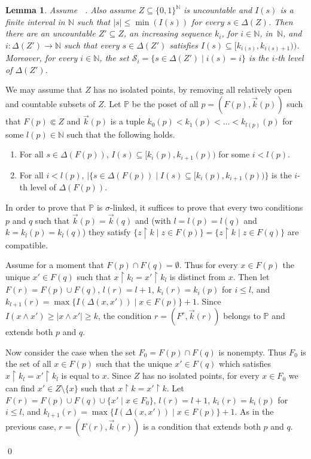 \documentclass{amsart}
\makeatletter
\def\N{\mathbb N}                        %
\def\rs{\restriction}
\def\text{\mbox}
\newtheorem{lemma}[proposition]{Lemma}
\theoremstyle{definition}
\theoremstyle{remark}
\def\twoo{\{0,1\}^{\N}}
\renewcommand{\proofname}{Proof}
\renewenvironment{proof}[1][\proofname]{\par
\let\oldqedsymbol\qedsymbol             %
  \normalfont
  \topsep6\p@\@plus6\p@ \trivlist
  \item[\hskip\labelsep\hskip\parindent\scshape
    #1\@addpunct{.}]\ignorespaces
}{%
  \qed\endtrivlist
\global\let\qedsymbol\oldqedsymbol      %
}
\newcommand{\bbN}{\mathbb N}
\newcommand{\cS}{\mathcal S}
\newcommand{\bbP}{\mathbb P}
\DeclareMathOperator{\MAsigma}{MA(\sigma-\text{linked})}
\numberwithin{claim}{subsection}
\makeatother
\begin{document}
\begin{lemma} \label{L.MAsl.thin}
	Assume $\MAsigma$. Also assume $Z\subseteq \twoo$ is uncountable and  $I(s)$ is a finite interval in $\bbN$  such that $|s|\leq \min(I(s))$ for every $s\in \Delta(Z)$.  Then there are an uncountable $Z'\subseteq Z$, an increasing sequence $k_i$, for $i\in \bbN$, in~$\bbN$, and $i\colon \Delta(Z')\to \bbN$  such that every $s\in \Delta(Z')$ satisfies $I(s)\subseteq [k_{i(s)},k_{i(s)+1}))$. Moreover, for every $i\in \bbN$, the set  $\cS_i=\{s\in \Delta(Z')\mid i(s)=i\}$ is the $i$-th level of $\Delta(Z')$. 
\end{lemma}

\begin{proof} We may assume that $Z$ has no isolated points, by removing all relatively open and countable subsets of $Z$. Let $\bbP$ be the poset of all $p=(F(p),\vec k(p))$ such that $F(p)\Subset Z$ and $\vec k(p)$ is a tuple $k_0(p)<k_1(p)<\dots< k_{l(p)}(p)$ for some $l(p)\in \bbN$ such that the following holds.
	\begin{enumerate}
		\item For all $s\in \Delta(F(p))$, $I(s)\subseteq [k_i(p), k_{i+1}(p))$ for some $i<l(p)$. 
		\item For all $i<l(p)$, $|\{s\in \Delta(F(p))\mid I(s)\subseteq [k_i(p), k_{i+1}(p))\}$ is the $i$-th level of $\Delta(F(p))$. 
	\end{enumerate}
	In order to prove that $\bbP$ is $\sigma$-linked, it suffices to prove that every two conditions $p$ and $q$ such that $\vec k(p)=\vec k(q)$ and (with $l=l(p)=l(q)$ and  $k=k_l(p)=k_l(q)$) they satisfy $\{z\rs k\mid z\in F(p)\}=\{z\rs k \mid z\in F(q)\}$ are compatible. 
	
	Assume for a moment that $F(p)\cap F(q)=\emptyset$. Thus for every $x\in F(p)$ the unique $x'\in F(q)$ such that $x\rs k_l=x'\rs k_l$ is distinct from $x$. 
	Then let $F(r)=F(p)\cup F(q)$, $l(r)=l+1$, $k_i(r)=k_i(p)$ for $i\leq l$, and $k_{l+1}(r)=\max\{I(\Delta(x,x')) \mid x\in F(p)\}+1$. 
	Since $I(x\wedge x')\geq |x\wedge x'|\geq k$,  	the condition $r=(F^r,\vec k(r))$ belongs to $\bbP$ and extends both $p$ and $q$. 
	
	Now consider the case when the set $F_0=F(p)\cap F(q)$  is nonempty. Thus $F_0$ is the set of all $x\in F(p)$ such that the unique $x'\in F(q)$ which satisfies $x\rs k_l=x'\rs k_l$ is equal to $x$. Since $Z$ has no isolated points, for every $x\in F_0$ we can find $x'\in Z\setminus \{x\}$ such that $x\rs k=x'\rs k$. Let $F(r)=F(p)\cup F(q)\cup \{x'\mid x\in F_0\}$, $l(r)=l+1$, $k_i(r)=k_i(p)$ for $i\leq l$, and $k_{l+1}(r)=\max\{I(\Delta(x,x')) \mid x\in F(p)\}+1$. 
	As in the previous case, $r=(F(r),\vec k(r))$	 is a condition that extends both $p$ and $q$. 
	

\end{proof}
\end{document}
